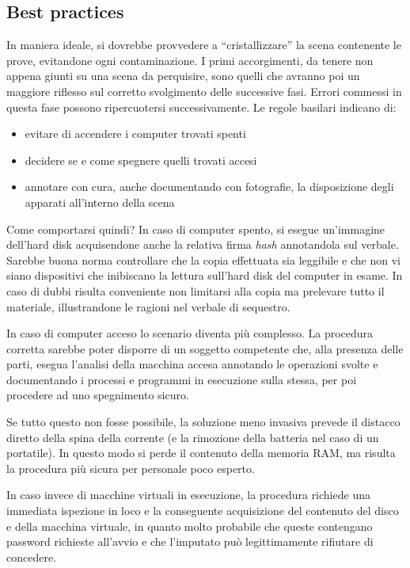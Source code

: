 \subsection{Best practices}

In maniera ideale, si dovrebbe provvedere a ``cristallizzare'' la scena contenente le prove, evitandone ogni contaminazione.
I primi accorgimenti, da tenere non appena giunti su una scena da perquisire, sono quelli che avranno poi un maggiore riflesso sul corretto svolgimento delle successive fasi. Errori commessi in questa fase possono ripercuotersi successivamente. Le regole basilari indicano di: 

\begin{itemize}
	
	\item{evitare di accendere i computer trovati spenti} 
	
	\item{decidere se e come spegnere quelli trovati accesi}
	
	\item{annotare con cura, anche documentando con fotografie, la disposizione degli apparati all'interno della scena} 

\end{itemize}

Come comportarsi quindi? In caso di computer spento, si esegue un'immagine dell'hard disk acquisendone anche la relativa firma \textit{hash} annotandola sul verbale. Sarebbe buona norma controllare che la copia effettuata sia leggibile e che non vi siano dispositivi che inibiscano la lettura sull'hard disk del computer in esame. In caso di dubbi risulta conveniente non limitarsi alla copia ma prelevare tutto il materiale, illustrandone le ragioni nel verbale di sequestro.

In caso di computer acceso lo scenario diventa più complesso. La procedura corretta sarebbe poter disporre di un soggetto competente che, alla presenza delle parti, esegua l'analisi della macchina accesa annotando le operazioni svolte e documentando i processi e programmi in esecuzione sulla stessa, per poi procedere ad uno spegnimento sicuro.

Se tutto questo non fosse possibile, la soluzione meno invasiva prevede il distacco diretto della spina della corrente (e la rimozione della batteria nel caso di un portatile). In questo modo si perde il contenuto della memoria RAM, ma risulta la procedura più sicura per personale poco esperto.

In caso invece di macchine virtuali in esecuzione, la procedura richiede una immediata ispezione in loco e la conseguente acquisizione del contenuto del disco e della macchina virtuale, in quanto molto probabile che queste contengano password richieste all'avvio e che l'imputato può legittimamente rifiutare di concedere.

